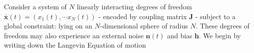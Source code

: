 Consider a system of $N$ linearly interacting degrees of freedom $\mathbf{\bar x}(t) = (x_1(t),\cdots x_N(t))$ - encoded by coupling matrix $\mathbf{J}$ - subject to a global constraint: lying on an $N$-dimensional sphere of radius $N$. These degrees of freedom may also experience an external noise $\mathbf{n}(t)$ and bias $\mathbf{h}$. We begin by writing down the Langevin Equation of motion